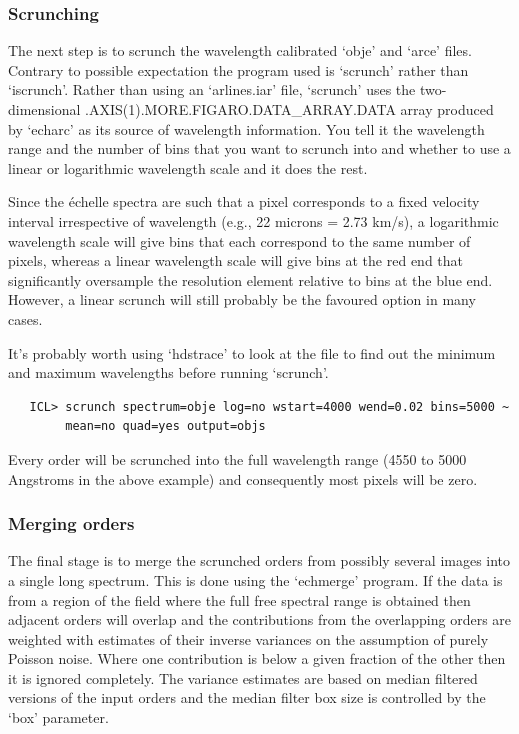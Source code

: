 \documentclass[11pt,twoside]{article}
\begin{document}

\subsubsection{\label{techno13scrunch}Scrunching}

   The next step is to scrunch the wavelength calibrated `obje' and
   `arce' files. Contrary to possible expectation the program used is
   `scrunch' rather than `iscrunch'. Rather than using an `arlines.iar'
   file, `scrunch' uses the two-dimensional
   .AXIS(1).\-MORE.\-FIGARO.\-DATA\_\-ARRAY.\-DATA array produced by
   `echarc' as its source of wavelength information. You tell it the
   wavelength range and the number of bins that you want to scrunch into
   and whether to use a linear or logarithmic wavelength scale and it
   does the rest.

   Since the \'echelle spectra are such that a pixel corresponds to
   a fixed velocity interval irrespective of wavelength (e.g., 22
   microns = 2.73 km/s), a logarithmic wavelength scale will give bins
   that each correspond to the same number of pixels, whereas a linear
   wavelength scale will give bins at the red end that significantly
   oversample the resolution element relative to bins at the blue end.
   However, a linear scrunch will still probably be the favoured option
   in many cases.

   It's probably worth using `hdstrace' to look at the file to find
   out the minimum and maximum wavelengths before running `scrunch'.

\begin{verbatim}
   ICL> scrunch spectrum=obje log=no wstart=4000 wend=0.02 bins=5000 ~
        mean=no quad=yes output=objs
\end{verbatim}

   Every order will be scrunched into the full wavelength range (4550 to
   5000 Angstroms in the above example) and consequently most pixels
   will be zero.


\subsubsection{\label{techno13merge}Merging orders}

   The final stage is to merge the scrunched orders from possibly
   several images into a single long spectrum. This is done using the
   `echmerge' program. If the data is from a region of the field where
   the full free spectral range is obtained then adjacent orders will
   overlap and the contributions from the overlapping orders are
   weighted with estimates of their inverse variances on the assumption
   of purely Poisson noise. Where one contribution is below a given
   fraction of the other then it is ignored completely. The variance
   estimates are based on median filtered versions of the input orders
   and the median filter box size is controlled by the `box' parameter.
\end{document}

